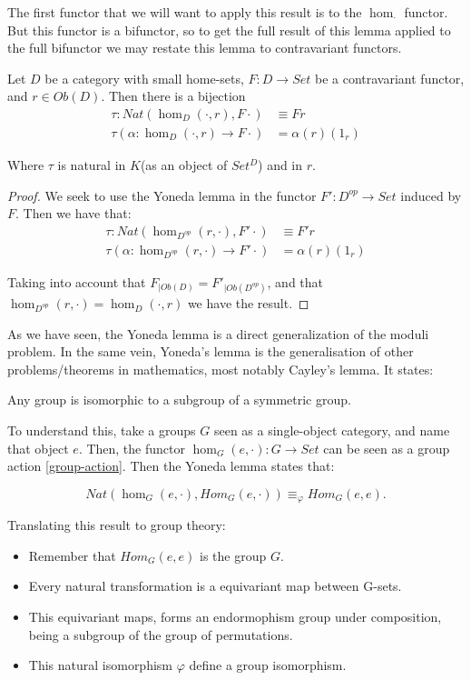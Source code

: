 The first functor that we will want to apply this result is to the $\hom_{\cdot}$ functor. But this functor is a bifunctor, so to get the full result of this lemma applied to the full bifunctor we may restate this lemma to contravariant functors.

\begin{corollary}
  Let $D$ be a category with small home-sets, $F:D\to Set$ be a contravariant functor, and $r\in Ob(D)$. Then there is a bijection
  \begin{align*}
    \tau:Nat(\hom_D(\cdot,r), F\cdot) &\equiv Fr\\
    \tau(\alpha:\hom_D(\cdot,r)\to F\cdot)& = \alpha(r)(1_r)
  \end{align*}
  
  Where $\tau$ is natural in $K$(as an object of $Set^{D}$) and in $r$.
\end{corollary}
\begin{proof}
  We seek to use the Yoneda lemma in the functor $F':D^{op}\to Set$ induced by $F$. Then we have that: 
  \begin{align*}
    \tau:Nat(\hom_{D^{op}}(r,\cdot), F'\cdot) &\equiv F'r\\
    \tau(\alpha:\hom_{D^{op}}(r,\cdot)\to F'\cdot)& = \alpha(r)(1_r)
  \end{align*}

  Taking into account that $F_{|Ob(D)}=F'_{|Ob(D^{op})}$, and that 
  $\hom_{D^{op}}(r,\cdot) = \hom_D(\cdot,r)$ we have the result.
\end{proof}

As we have seen, the Yoneda lemma is a direct generalization of the moduli problem. In the same vein, Yoneda's lemma is the generalisation of other problems/theorems in mathematics, most notably Cayley's lemma. It states:
\begin{proposition} \label{Cayleys}
  Any group is isomorphic to a subgroup of a symmetric group.
\end{proposition}

To understand this, take a groups $G$ seen as a single-object category, and name that object $e$. Then, the functor $\hom_G(e, \cdot): G \to Set$ can be seen as a group action \ref{group-action}. Then the Yoneda lemma states that:

$$Nat(\hom_G(e,\cdot), Hom_G(e,\cdot)) \equiv_\varphi Hom_G(e,e).$$

Translating this result to group theory:
\begin{itemize}
\item Remember that $Hom_G(e,e)$ is the group $G$.
\item Every natural transformation is a equivariant map between G-sets.
\item This equivariant maps, forms an endormophism group under composition, being a subgroup of the group of permutations.
\item This natural isomorphism $\varphi$ define a group isomorphism.
\end{itemize}

